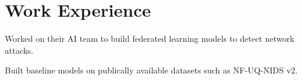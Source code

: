 \documentclass[]{resume-template}
\begin{document}
\begin{minipage}[t]{0.66\textwidth}

  \section{Work Experience}\label{sec:Work Experience}
  \label{subsec:protectionshield}
  \vspace{\topsep}
  \begin{tightemize}
  \item Worked on their AI team to build federated learning models to detect network attacks.
  \item Built baseline models on publically available datasets such as NF-UQ-NIDS v2.
  \end{tightemize}


\end{minipage}
\end{document}
